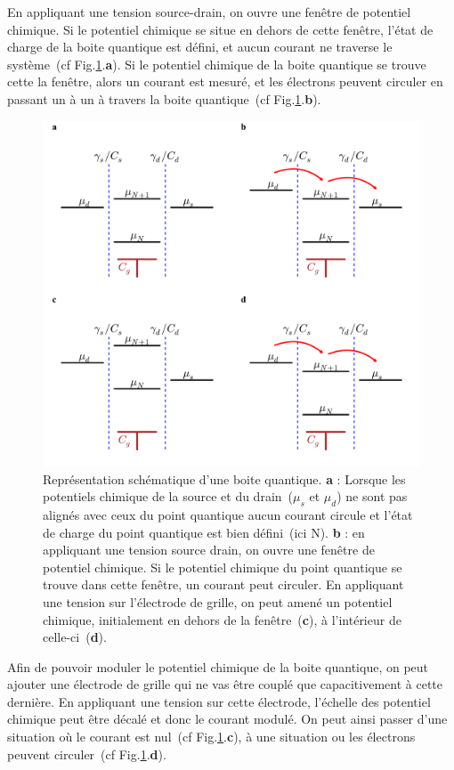 En appliquant une tension source-drain, on ouvre une fenêtre de potentiel chimique. Si le potentiel chimique se situe en dehors de cette fen\^etre, l'état de charge de la boite quantique est défini, et aucun courant ne traverse le système~(cf Fig.\ref{DotSchem}.\textbf{a}). Si le potentiel chimique de la boite quantique se trouve cette la fen\^etre, alors un courant est mesuré, et les électrons peuvent circuler en passant un à un à travers la boite quantique~(cf Fig.\ref{DotSchem}.\textbf{b}). 

\begin{figure}
\centering \includegraphics[scale=0.45]{Resultats/DotSchem/DotSchem.pdf} 
\caption{Représentation schématique d'une boite quantique. \textbf{a} : Lorsque les potentiels chimique de la source et du drain~($\mu_s$ et $\mu_d$) ne sont pas alignés avec ceux du point quantique aucun courant circule et l'état de charge du point quantique est bien défini~(ici N). \textbf{b} : en appliquant une tension source drain, on ouvre une fenêtre de potentiel chimique. Si le potentiel chimique du point quantique se trouve dans cette fenêtre, un courant peut circuler. En appliquant une tension sur l'électrode de grille, on peut amené un potentiel chimique, initialement en dehors de la fenêtre~(\textbf{c}), à l'intérieur de celle-ci~(\textbf{d}).}
\label{DotSchem}
\end{figure}


Afin de pouvoir moduler le potentiel chimique de la boite quantique, on peut ajouter une électrode de grille qui ne vas être couplé que capacitivement à cette dernière. En appliquant une tension sur cette électrode, l'échelle des potentiel chimique peut être décalé et donc le courant modulé. On peut ainsi passer d'une situation où le courant est nul~(cf Fig.\ref{DotSchem}.\textbf{c}), à une situation ou les électrons peuvent circuler~(cf Fig.\ref{DotSchem}.\textbf{d}).

